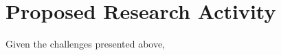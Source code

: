 \section{Proposed Research Activity}
\label{sec:research_activity}
Given the challenges presented above, 